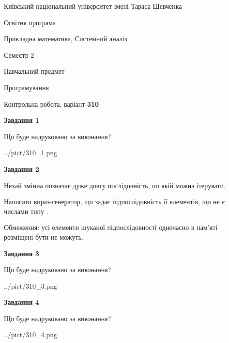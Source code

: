 \documentclass[12pt, ukrainian]{article}
\begin{document}
{{\begin {small}\par
{ \center  Київський національний університет імені Тараса Шевченка \par}
{\parbox {5 cm}{Освітня програма \hfill}{\parbox {8 cm}{Прикладна математика, Системний аналіз \hfill}}\parbox {5 cm}{\hfill Семестр 2}}\par
{\parbox {5 cm} {Навчальний предмет \hfill}\parbox {7 cm}{Програмування \hfill}\parbox {6cm}{\hfill}\par}\vspace{-7pt} \end{small}}{\center Контрольна робота, варіант  \No \textbf
{ 310 }\par}}
{
\begin {large}
{\begin {center}\textbf{Завдання 1}\end {center}}\par
Що буде надруковано за виконання?\par\par
\begin{center}
	{../pict/310_1.png}
\end{center}
\newpage

{\begin {center}\textbf{Завдання 2}\end {center}}\par
Нехай змінна  позначає дуже довгу послідовність, по якій можна ітерувати.

Написати вираз-генератор, що задає підпослідовність її елементів, що не є числами типу .

Обмеження: усі елементи шуканої підпослідовності одночасно в пам'яті розміщені бути не можуть.\par
\newpage

{\begin {center}\textbf{Завдання 3}\end {center}}\par
Що буде надруковано за виконання?\par
\begin{center}
	{../pict/310_3.png}
\end{center}
\newpage

{\begin {center}\textbf{Завдання 4}\end {center}}\par
Що буде надруковано за виконання?\par
\begin{center}
	{../pict/310_4.png}
\end{center}
\newpage


\end{large}}
\end{document}
